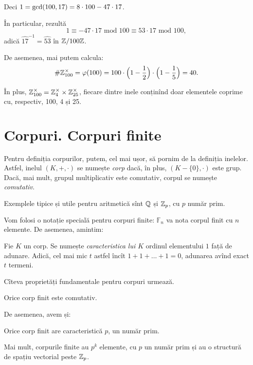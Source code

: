 Deci $ 1 = \mathrm{gcd}(100, 17) = 8 \cdot 100 - 47 \cdot 17 $.

În particular, rezultă
\[
  1 \equiv -47 \cdot 17 \text{ mod } 100 \equiv 53 \cdot 17 \text{ mod } 100,
\]
adică $ \widehat{17}^{-1} = \widehat{53} $ în $ \mathbb{Z}/100\mathbb{Z} $.

De asemenea, mai putem calcula:
\[
  \# \ZZ_{100}^\times = \varphi(100) = %
  100 \cdot \Big(1 - \frac{1}{2}\Big) \cdot \Big( 1 - \frac{1}{5} \Big) = 40.
\]

În plus, $ \mathbb{Z}_{100}^\times = \mathbb{Z}_4^\times \times \mathbb{Z}_{25}^\times $, fiecare
dintre inele conținînd doar elementele coprime cu, respectiv, 100, 4 și 25.


\section{Corpuri. Corpuri finite}

Pentru definiția corpurilor, putem, cel mai ușor, să pornim de la definiția
inelelor. Astfel, inelul $ (K, +, \cdot) $ se numește \emph{corp} dacă,
în plus, $ (K - \{0\}, \cdot) $ este grup. Dacă, mai mult, grupul multiplicativ
este comutativ, corpul se numește \emph{comutativ}.

Exemplele tipice și utile pentru aritmetică sînt $ \mathbb{Q} $ și $ \mathbb{Z}_p $, cu $ p $
număr prim.

Vom folosi o notație specială pentru corpuri finite: $ \mathbb{F}_n $ va
nota corpul finit cu $ n $ elemente. De asemenea, amintim:
\begin{definition}\label{def:caracteristica}
  Fie $ K $ un corp. Se numește \emph{caracteristica lui $ K $} ordinul
  elementului $ 1 $ față de adunare. Adică, cel mai mic $ t $ astfel încît
  $ 1 + 1 + \dots + 1 = 0 $, adunarea avînd exact $ t $ termeni.
\end{definition}

Cîteva proprietăți fundamentale pentru corpuri urmează.

\begin{theorem}[Wedderburn]\label{thm:wedd} 
  Orice corp finit este comutativ.  
\end{theorem}

De asemenea, avem și:
\begin{theorem}\label{thm:corp-fin}
  Orice corp finit are caracteristică $ p $, un număr prim.

  Mai mult, corpurile finite au $ p^k $ elemente, cu $ p $ un număr prim
  și au o structură de spațiu vectorial peste $ \mathbb{Z}_p $.
\end{theorem}

